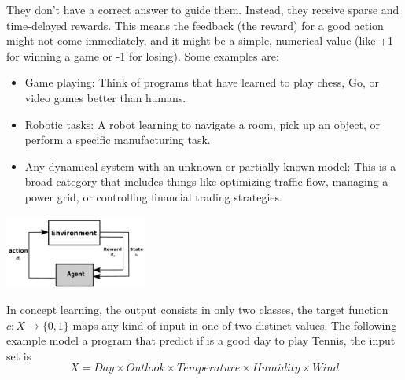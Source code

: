 \documentclass[10pt, letterpaper]{report}
\begin{document}
They don't have a correct answer to guide them. Instead, they receive sparse and time-delayed rewards. This means the feedback (the reward) for a good action might not come immediately, and it might be a simple, numerical value (like +1 for winning a game or -1 for losing). Some examples are:\begin{itemize}
	\item Game playing: Think of programs that have learned to play chess, Go, or video games better than humans.
	\item Robotic tasks: A robot learning to navigate a room, pick up an object, or perform a specific manufacturing task.
	\item Any dynamical system with an unknown or partially known model: This is a broad category that includes things like optimizing traffic flow, managing a power grid, or controlling financial trading strategies.
\end{itemize}
\begin{center}
	\includegraphics[width=0.35\textwidth]{images/RL_diagram.png}
\end{center}
In concept learning, the output consists in only two classes, the target function $c:X\rightarrow\{0,1\}$ maps  any kind of input in one of two distinct values. The following example model a program that predict if is a good day to play Tennis, the input set is $$
	X=Day\times Outlook \times Temperature \times Humidity \times Wind
$$
\end{document}

